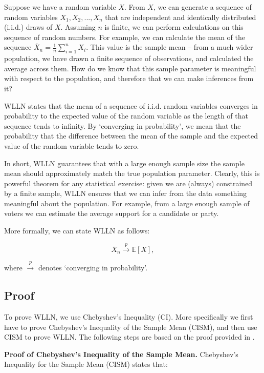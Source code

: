 \documentclass[
]{book}
\begin{document}
Suppose we have a random variable \(X\). From \(X\), we can generate a sequence of random variables \(X_1, X_2,..., X_n\) that are independent and identically distributed (i.i.d.) draws of \(X\). Assuming \(n\) is finite, we can perform calculations on this sequence of random numbers. For example, we can calculate the mean of the sequence \(\bar{X}_n = \frac{1}{n}\sum^n_{i=1}X_i\). This value is the sample mean -- from a much wider population, we have drawn a finite sequence of observations, and calculated the average across them. How do we know that this sample parameter is meaningful with respect to the population, and therefore that we can make inferences from it?

WLLN states that the mean of a sequence of i.i.d. random variables converges in probability to the expected value of the random variable as the length of that sequence tends to infinity. By `converging in probability', we mean that the probability that the difference between the mean of the sample and the expected value of the random variable tends to zero.

In short, WLLN guarantees that with a large enough sample size the sample mean should approximately match the true population parameter. Clearly, this is powerful theorem for any statistical exercise: given we are (always) constrained by a finite sample, WLLN ensures that we can infer from the data something meaningful about the population. For example, from a large enough sample of voters we can estimate the average support for a candidate or party.

More formally, we can state WLLN as follows:

\begin{equation}
\bar{X}_n \xrightarrow{p} \mathbb{E}[X],
\end{equation}

where \(\xrightarrow{p}\) denotes `converging in probability'.

\hypertarget{proof_wlln}{%
\subsection{Proof}\label{proof_wlln}}

To prove WLLN, we use Chebyshev's Inequality (CI). More specifically we first have to prove Chebyshev's Inequality of the Sample Mean (CISM), and then use CISM to prove WLLN. The following steps are based on the proof provided in \citet{aronow2019foundations}.

\textbf{Proof of Chebyshev's Inequality of the Sample Mean.} Chebyshev's Inequality for the Sample Mean (CISM) states that:
\end{document}
